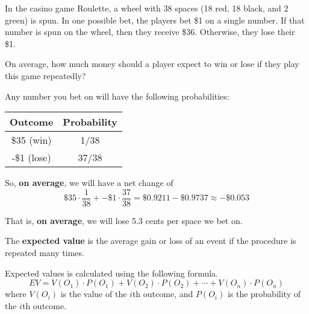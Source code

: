 \documentclass{beamer}
\begin{document}
\begin{frame}
\begin{example}
In the casino game Roulette, a wheel with 38 spaces (18 red, 18 black, and 2 green) is spun. In one possible bet, the players bet \$1 on a single number. If that number is spun on the wheel, then they receive \$36. Otherwise, they lose their \$1.

\vspace{2mm}
On average, how much money should a player expect to win or lose if they play this game repeatedly?\pause

\vspace{2mm}
Any number you bet on will have the following probabilities:
\begin{center}
\begin{tabular}{|c|c|} \hline
Outcome & Probability \\ \hline
\$35 (win) & 1/38 \\\hline
-\$1 (lose) & 37/38 \\ \hline
\end{tabular}
\end{center}\pause

So, \textbf{on average}, we will have a net change of
\begin{equation*}
\$35\cdot\dfrac{1}{38} + -\$1\cdot\dfrac{37}{38} = \$0.9211 - \$0.9737 \approx -\$0.053
\end{equation*}

That is, \textbf{on average}, we will lose 5.3 cents per space we bet on.
\end{example}
\end{frame}

\begin{frame}
\begin{definition}
The \textbf{expected value} is the average gain or loss of an event if the procedure is repeated many times.

\vspace{2mm}
Expected values is calculated using the following formula.
\begin{equation*}
EV = V(O_1)\cdot P(O_1)+V(O_2)\cdot P(O_2)+\cdots+V(O_n)\cdot P(O_n)
\end{equation*}
where $V(O_i)$ is the value of the $i$th outcome, and $P(O_i)$ is the probability of the $i$th outcome.\end{definition}
\end{frame}
\end{document}

